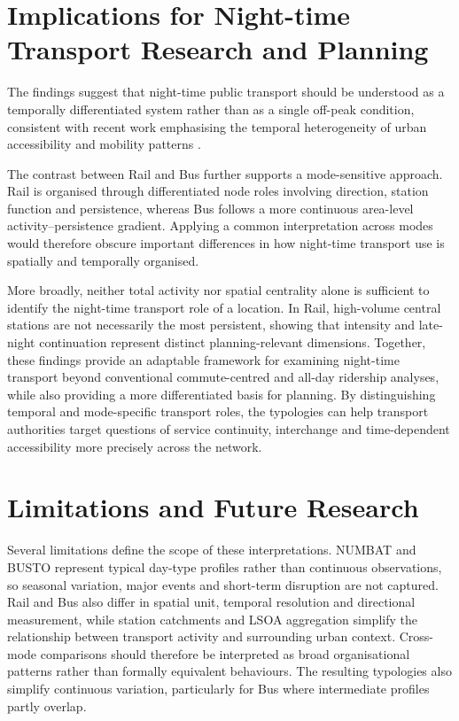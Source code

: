\section{Implications for Night-time Transport Research and Planning}

The findings suggest that night-time public transport should be understood as a temporally differentiated system rather than as a single off-peak condition, consistent with recent work emphasising the temporal heterogeneity of urban accessibility and mobility patterns \citep{Ryan2023}.

The contrast between Rail and Bus further supports a mode-sensitive approach. Rail is organised through differentiated node roles involving direction, station function and persistence, whereas Bus follows a more continuous area-level activity--persistence gradient. Applying a common interpretation across modes would therefore obscure important differences in how night-time transport use is spatially and temporally organised.

More broadly, neither total activity nor spatial centrality alone is sufficient to identify the night-time transport role of a location. In Rail, high-volume central stations are not necessarily the most persistent, showing that intensity and late-night continuation represent distinct planning-relevant dimensions. Together, these findings provide an adaptable framework for examining night-time transport beyond conventional commute-centred and all-day ridership analyses, while also providing a more differentiated basis for planning. By distinguishing temporal and mode-specific transport roles, the typologies can help transport authorities target questions of service continuity, interchange and time-dependent accessibility more precisely across the network.

\section{Limitations and Future Research}

Several limitations define the scope of these interpretations. NUMBAT and BUSTO represent typical day-type profiles rather than continuous observations, so seasonal variation, major events and short-term disruption are not captured. Rail and Bus also differ in spatial unit, temporal resolution and directional measurement, while station catchments and LSOA aggregation simplify the relationship between transport activity and surrounding urban context. Cross-mode comparisons should therefore be interpreted as broad organisational patterns rather than formally equivalent behaviours. The resulting typologies also simplify continuous variation, particularly for Bus where intermediate profiles partly overlap.


